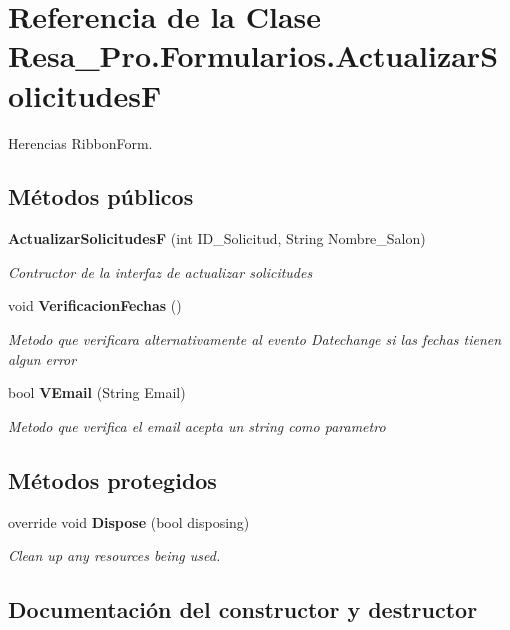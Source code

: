 \section{Referencia de la Clase Resa\+\_\+\+Pro.\+Formularios.\+Actualizar\+SolicitudesF}
\label{class_resa___pro_1_1_formularios_1_1_actualizar_solicitudes_f}


Herencias Ribbon\+Form.

\subsection*{Métodos públicos}
\begin{DoxyCompactItemize}
\item 
{\bf Actualizar\+SolicitudesF} (int I\+D\+\_\+\+Solicitud, String Nombre\+\_\+\+Salon)
\begin{DoxyCompactList}\small\item\em Contructor de la interfaz de actualizar solicitudes \end{DoxyCompactList}\item 
void {\bf Verificacion\+Fechas} ()
\begin{DoxyCompactList}\small\item\em Metodo que verificara alternativamente al evento Datechange si las fechas tienen algun error \end{DoxyCompactList}\item 
bool {\bf V\+Email} (String Email)
\begin{DoxyCompactList}\small\item\em Metodo que verifica el email acepta un string como parametro \end{DoxyCompactList}\end{DoxyCompactItemize}
\subsection*{Métodos protegidos}
\begin{DoxyCompactItemize}
\item 
override void {\bf Dispose} (bool disposing)
\begin{DoxyCompactList}\small\item\em Clean up any resources being used. \end{DoxyCompactList}\end{DoxyCompactItemize}


\subsection{Documentación del constructor y destructor}
